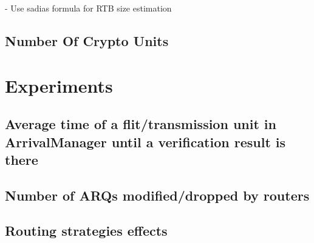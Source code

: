 - Use sadias formula for RTB size estimation

\subsection{Number Of Crypto Units}

\section{Experiments}
\subsection{Average time of a flit/transmission unit in ArrivalManager until a verification result is there}
\subsection{Number of ARQs modified/dropped by routers}
\subsection{Routing strategies effects}

\iffalse
Experiment setup parameter tables:
- NC mode (UC, G2C3, G2C4)
- ...

ARQ Limit: 1, at most 2 because more ARQs allowed per transmission unit means larger retransmission buffers everywhere
\fi
